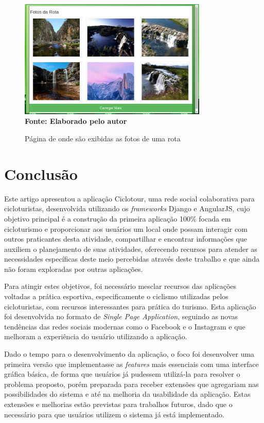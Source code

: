 \begin{figure}[!ht]
	\centering	
	\caption[\hspace{0.1cm} Fotos da Rota.]
	{Página de onde são exibidas as fotos de uma rota}
	  \vspace{-0.4cm}
	\includegraphics[width=0.8\textwidth]{figuras/fotosRota.png}
	 \vspace{0cm}
	\\\textbf{\footnotesize Fonte: Elaborado pelo autor}
	\label{fig:fotosRota}
\end{figure}

\section{\esp Conclusão}
Este artigo apresentou a aplicação Ciclotour, uma rede social colaborativa para cicloturistas, desenvolvida utilizando os \textit{frameworks} Django 
e AngularJS, cujo objetivo principal é a construção da primeira aplicação 100\% focada em cicloturismo e proporcionar aos usuários um local onde 
possam interagir com outros praticantes desta atividade, compartilhar e encontrar informações que auxiliem o planejamento de suas atividades, 
oferecendo recursos para atender as necessidades específicas deste meio percebidas através deste trabalho e que ainda não foram exploradas por 
outras aplicações.

Para atingir estes objetivos, foi necessário mesclar recursos das aplicações voltadas a prática esportiva, especificamente o ciclismo utilizadas pelos
cicloturistas, com recursos interessantes para prática do turismo. Esta aplicação foi desenvolvida no formato de \textit{Single Page Application}, 
seguindo as novas tendências das redes sociais modernas como o Facebook e o Instagram e que melhoram a experiência do usuário utilizando a aplicação.

Dado o tempo para o desenvolvimento da aplicação, o foco foi desenvolver uma primeira versão que implementasse as \textit{features} mais essenciais
com uma interface gráfica básica, de forma que usuários já pudessem utilizá-la para resolver o problema proposto, porém preparada para receber 
extensões que agregariam nas possibilidades do sistema e até  na melhoria da usabilidade da aplicação. Estas extensões e melhorias estão previstas 
para trabalhos futuros, dado que o necessário para que usuários utilizem o sistema já está implementado. 

